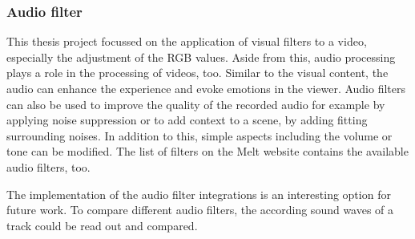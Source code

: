 \documentclass[../MasterThesis.tex]{subfiles}
\begin{document}
\subsubsection*{Audio filter}

This thesis project focussed on the application of visual filters to a video, especially the adjustment of the RGB values. Aside from this, audio processing plays a role in the processing of videos, too. Similar to the visual content, the audio can enhance the experience and evoke emotions in the viewer. Audio filters can also be used to improve the quality of the recorded audio for example by applying noise suppression or to add context to a scene, by adding fitting surrounding noises. In addition to this, simple aspects including the volume or tone can be modified.
The list of filters on the Melt website contains the available audio filters, too.~\cite{melt}

The implementation of the audio filter integrations is an interesting option for future work. To compare different audio filters, the according sound waves of a track could be read out and compared.









	
	
	
\end{document}
